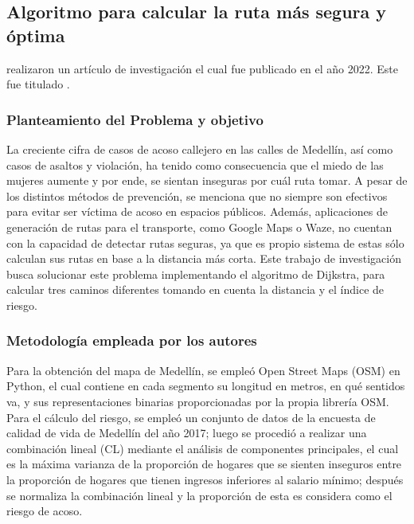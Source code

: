 \subsection{Algoritmo para calcular la ruta más segura y óptima \citep*{pr_areiza}}
\citeauthor{pr_areiza} realizaron un artículo de investigación el cual fue publicado en el año 2022. Este fue titulado .

\subsubsection{Planteamiento del Problema y objetivo }
La creciente cifra de casos de acoso callejero en las calles de Medellín, así como casos de asaltos y violación, ha tenido como consecuencia que el miedo de las mujeres aumente y por ende, se sientan inseguras por cuál ruta tomar. A pesar de los distintos métodos de prevención, se menciona que no siempre son efectivos para evitar ser víctima de acoso en espacios públicos. Además, aplicaciones de generación de rutas para el transporte, como Google Maps o Waze, no cuentan con la capacidad de detectar rutas seguras, ya que es propio sistema de estas sólo calculan sus rutas en base a la distancia más corta. Este trabajo de investigación busca solucionar este problema implementando el algoritmo de Dijkstra, para calcular tres caminos diferentes tomando en cuenta la distancia y el índice de riesgo.

\subsubsection{Metodología empleada por los autores}


Para la obtención del mapa de Medellín, se empleó Open Street Maps (OSM) en Python, el cual contiene en cada segmento su longitud en metros, en qué sentidos va, y sus representaciones binarias proporcionadas por la propia librería OSM. Para el cálculo del riesgo, se empleó un conjunto de datos de la encuesta de calidad de vida de Medellín del año 2017; luego se procedió a realizar una combinación lineal (CL)  mediante el análisis de componentes principales, el cual  es la máxima varianza de la proporción de hogares que se sienten inseguros entre la proporción de hogares que tienen ingresos inferiores al salario mínimo; después se normaliza la combinación lineal y la proporción de esta es considera como el riesgo de acoso.

